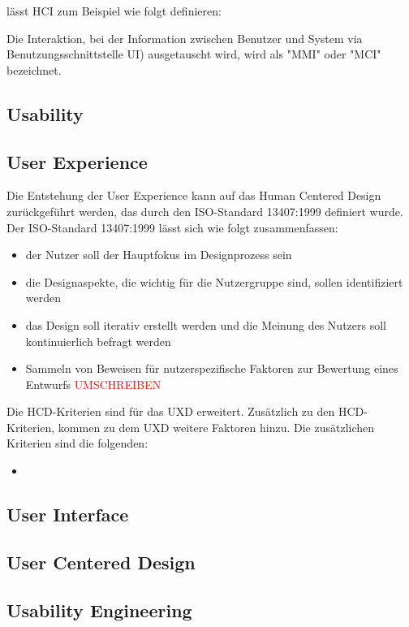 \noindent \citet{heimgartner_interkulturelles_2017} lässt \ac{HCI} zum Beispiel wie folgt definieren:

\begin{definition}
  Die Interaktion, bei der Information zwischen Benutzer und System via Benutzungsschnittstelle \ac{UI}) ausgetauscht wird, wird als "\ac{MMI}"  oder  "\ac{MCI}" bezeichnet.
\end{definition}

\subsection{Usability}

\subsection{User Experience}

Die Entstehung der User Experience kann auf das Human Centered Design zurückgeführt werden, das durch den ISO-Standard 13407:1999 definiert wurde.
Der ISO-Standard 13407:1999 lässt sich wie folgt zusammenfassen:

\begin{itemize}
	\item der Nutzer soll der Hauptfokus im Designprozess sein
	\item die Designaspekte, die wichtig für die Nutzergruppe sind, sollen identifiziert werden
	\item das Design soll iterativ erstellt werden und die Meinung des Nutzers soll kontinuierlich befragt werden
	\item Sammeln von Beweisen für nutzerspezifische Faktoren zur Bewertung eines Entwurfs \textcolor{red}{UMSCHREIBEN}
\end{itemize}

Die HCD-Kriterien sind für das UXD erweitert.
Zusätzlich zu den HCD-Kriterien, kommen zu dem UXD weitere Faktoren hinzu.
Die zusätzlichen Kriterien sind die folgenden:

\begin{itemize}
	\item
\end{itemize}

\subsection{User Interface}

\subsection{User Centered Design}

\subsection{Usability Engineering}
